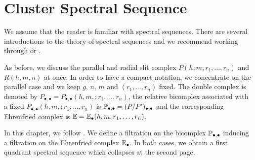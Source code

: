 \chapter{Cluster Spectral Sequence}
\label{chapter_css}
We assume that the reader is familiar with spectral sequences.
There are several introductions to the theory of spectral sequences and we recommend working through \cite[Chapter 5]{Weibel1995} or \cite[Chapter 9]{Spanier199412}.

As before, we discuss the parallel and radial slit complex $P(h,m;r_1, \ldots, r_n)$ and $R(h,m,n)$ at once.
In order to have a compact notation, we concentrate on the parallel case and
we keep $g$, $n$, $m$ and $(r_1, \ldots, r_n)$ fixed.
\label{page:PP}%
The double complex is denoted by $P_{\bullet,\bullet} = P_{\bullet,\bullet}(h,m,; r_1, \ldots, r_n)$,
the relative bicomplex associated with a fixed $P_{\bullet,\bullet}(h,m,; r_1, \ldots, r_n)$ is $\mathbb P_{\bullet, \bullet} = (P / P')_{\bullet, \bullet}$
and the corresponding Ehrenfried complex is $\E = \E_\bullet(h,m; r_1, \ldots, r_n)$.

In this chapter, we follow \cite{Boedigheimer201314}.
We define a filtration on the bicomplex $\mathbb P_{\bullet, \bullet}$ inducing a filtration on the Ehrenfried complex $\mathbb E_\bullet$.
In both cases, we obtain a first quadrant spectral sequence which collapses at the second page.

